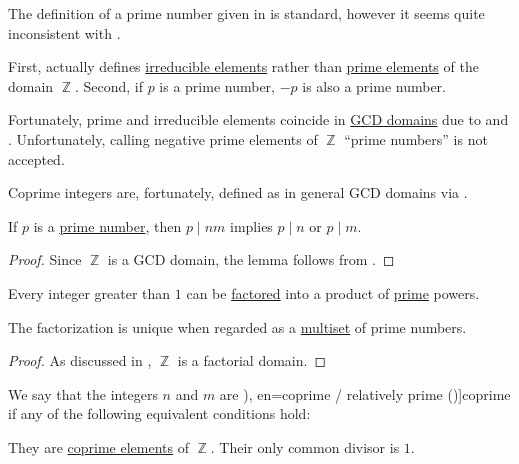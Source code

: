 \begin{remark}\label{rem:prime_numbers}
  The definition of a prime number given in  is standard, however it seems quite inconsistent with .

  First,  actually defines \hyperref[def:domain_divisibility/irreducible]{irreducible elements} rather than \hyperref[def:domain_divisibility/prime]{prime elements} of the domain \( \BbbZ \). Second, if \( p \) is a prime number, \( -p \) is also a prime number.

  Fortunately, prime and irreducible elements coincide in \hyperref[def:gcd_domain]{GCD domains} due to  and . Unfortunately, calling negative prime elements of \( \BbbZ \) \enquote{prime numbers} is not accepted.

  Coprime integers are, fortunately, defined as in general GCD domains via .
\end{remark}

\begin{lemma}\label{thm:euclids_lemma}
  If \( p \) is a \hyperref[def:prime_number]{prime number}, then \( p \mid nm \) implies \( p \mid n \) or \( p \mid m \).
\end{lemma}
\begin{proof}
  Since \( \BbbZ \) is a GCD domain, the lemma follows from .
\end{proof}

\begin{theorem}\label{thm:fundamental_theorem_of_arithmetic}
  Every integer greater than \( 1 \) can be \hyperref[def:irreducible_factorization]{factored} into a product of \hyperref[def:prime_number]{prime} powers.
\end{theorem}
\begin{comments}
  \item The factorization is unique when regarded as a \hyperref[def:multiset]{multiset} of prime numbers.
\end{comments}
\begin{proof}
  As discussed in , \( \BbbZ \) is a factorial domain.
\end{proof}

\begin{definition}\label{def:coprime_numbers}
  We say that the integers \( n \) and \( m \) are \term[ru=взаимно простые (числа) (\cite[45]{Зорич2019АнализТом1}), en=coprime / relatively prime (\cite[231]{Rosen2018DiscreteHandbook})]{coprime} if any of the following equivalent conditions hold:
  \begin{thmenum}
     They are \hyperref[def:coprime_elements]{coprime elements} of \( \BbbZ \).
     Their only  common divisor is \( 1 \).
  \end{thmenum}
\end{definition}

